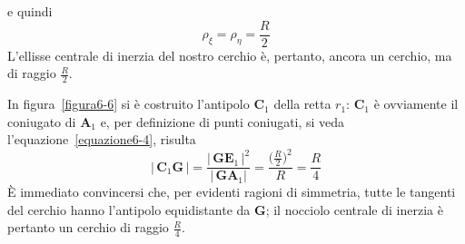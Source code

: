 e quindi 
\begin{equation*}
\rho_{\xi} = \rho_{\eta} = \frac{R}{2}
\end{equation*}
L'ellisse centrale di inerzia del nostro cerchio è, pertanto, ancora un cerchio, ma di raggio $\frac{R}{2}$. 

\noindent In figura~\ref{figura6-6} si è costruito l'antipolo $\mathbf{C}_1$ della retta $r_1$: $\mathbf{C}_1$ è ovviamente il coniugato di $\mathbf{A}_1$ e, per definizione di punti coniugati, si veda l'equazione~\eqref{equazione6-4}, risulta 
\begin{equation*}
\lvert\,\mathbf{C}_{1}\mathbf{G}\,\lvert = \frac{\lvert\,\mathbf{G}\mathbf{E}_{1}\,\lvert^{2}}{\lvert\,\mathbf{G}\mathbf{A}_{1}\lvert} = \frac{\bigl(\frac{R}{2}\bigr)^2}{R} = \frac{R}{4}
\end{equation*}
È immediato convincersi che, per evidenti ragioni di simmetria, tutte le tangenti del cerchio hanno l'antipolo equidistante da $\mathbf{G}$; il nocciolo centrale di inerzia è pertanto un cerchio di raggio $\frac{R}{4}$.

